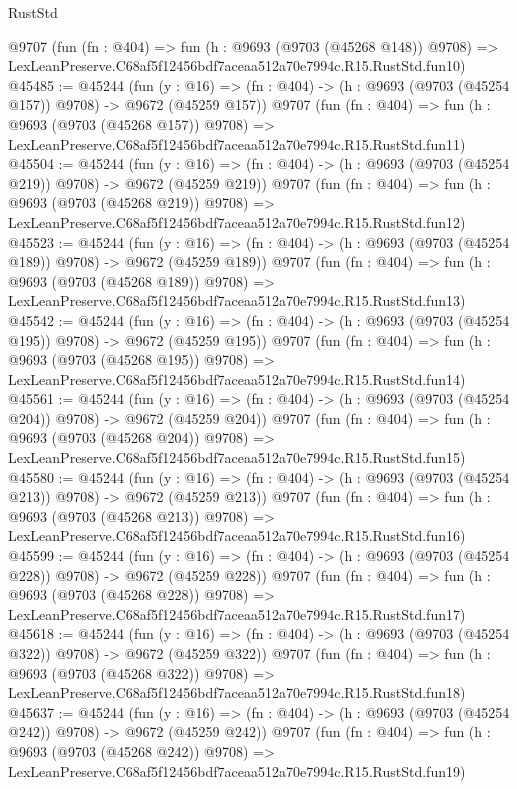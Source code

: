 \begin{lexlean}{RustStd}
\begin{coremodule}
    @9707
    (fun (fn : @404) =>
    fun (h : @9693 (@9703 (@45268 @148)) @9708) =>
    LexLeanPreserve.C68af5f12456bdf7aceaa512a70e7994c.R15.RustStd.fun10)
@45485 := @45244
    (fun (y : @16) => (fn : @404) -> (h : @9693 (@9703 (@45254 @157)) @9708) -> @9672 (@45259 @157))
    @9707
    (fun (fn : @404) =>
    fun (h : @9693 (@9703 (@45268 @157)) @9708) =>
    LexLeanPreserve.C68af5f12456bdf7aceaa512a70e7994c.R15.RustStd.fun11)
@45504 := @45244
    (fun (y : @16) => (fn : @404) -> (h : @9693 (@9703 (@45254 @219)) @9708) -> @9672 (@45259 @219))
    @9707
    (fun (fn : @404) =>
    fun (h : @9693 (@9703 (@45268 @219)) @9708) =>
    LexLeanPreserve.C68af5f12456bdf7aceaa512a70e7994c.R15.RustStd.fun12)
@45523 := @45244
    (fun (y : @16) => (fn : @404) -> (h : @9693 (@9703 (@45254 @189)) @9708) -> @9672 (@45259 @189))
    @9707
    (fun (fn : @404) =>
    fun (h : @9693 (@9703 (@45268 @189)) @9708) =>
    LexLeanPreserve.C68af5f12456bdf7aceaa512a70e7994c.R15.RustStd.fun13)
@45542 := @45244
    (fun (y : @16) => (fn : @404) -> (h : @9693 (@9703 (@45254 @195)) @9708) -> @9672 (@45259 @195))
    @9707
    (fun (fn : @404) =>
    fun (h : @9693 (@9703 (@45268 @195)) @9708) =>
    LexLeanPreserve.C68af5f12456bdf7aceaa512a70e7994c.R15.RustStd.fun14)
@45561 := @45244
    (fun (y : @16) => (fn : @404) -> (h : @9693 (@9703 (@45254 @204)) @9708) -> @9672 (@45259 @204))
    @9707
    (fun (fn : @404) =>
    fun (h : @9693 (@9703 (@45268 @204)) @9708) =>
    LexLeanPreserve.C68af5f12456bdf7aceaa512a70e7994c.R15.RustStd.fun15)
@45580 := @45244
    (fun (y : @16) => (fn : @404) -> (h : @9693 (@9703 (@45254 @213)) @9708) -> @9672 (@45259 @213))
    @9707
    (fun (fn : @404) =>
    fun (h : @9693 (@9703 (@45268 @213)) @9708) =>
    LexLeanPreserve.C68af5f12456bdf7aceaa512a70e7994c.R15.RustStd.fun16)
@45599 := @45244
    (fun (y : @16) => (fn : @404) -> (h : @9693 (@9703 (@45254 @228)) @9708) -> @9672 (@45259 @228))
    @9707
    (fun (fn : @404) =>
    fun (h : @9693 (@9703 (@45268 @228)) @9708) =>
    LexLeanPreserve.C68af5f12456bdf7aceaa512a70e7994c.R15.RustStd.fun17)
@45618 := @45244
    (fun (y : @16) => (fn : @404) -> (h : @9693 (@9703 (@45254 @322)) @9708) -> @9672 (@45259 @322))
    @9707
    (fun (fn : @404) =>
    fun (h : @9693 (@9703 (@45268 @322)) @9708) =>
    LexLeanPreserve.C68af5f12456bdf7aceaa512a70e7994c.R15.RustStd.fun18)
@45637 := @45244
    (fun (y : @16) => (fn : @404) -> (h : @9693 (@9703 (@45254 @242)) @9708) -> @9672 (@45259 @242))
    @9707
    (fun (fn : @404) =>
    fun (h : @9693 (@9703 (@45268 @242)) @9708) =>
    LexLeanPreserve.C68af5f12456bdf7aceaa512a70e7994c.R15.RustStd.fun19)

\end{coremodule}
\end{lexlean}
